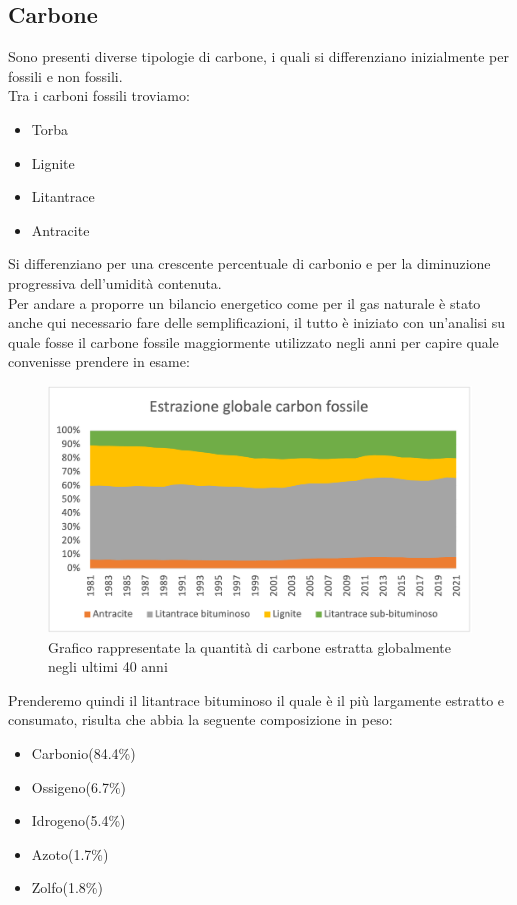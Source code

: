 \subsection{Carbone}
Sono presenti diverse tipologie di carbone, i quali si differenziano inizialmente per fossili e non fossili.\\
Tra i carboni fossili troviamo:
\begin{itemize}
    \item Torba
    \item Lignite
    \item Litantrace
    \item Antracite
\end{itemize}
Si differenziano per una crescente percentuale di carbonio e per la diminuzione progressiva dell'umidità contenuta.\\
Per andare a proporre un bilancio energetico come per il gas naturale è stato anche qui necessario fare delle semplificazioni, il tutto è iniziato con un'analisi su quale fosse il carbone fossile maggiormente utilizzato negli anni per capire quale convenisse prendere in esame:\cite{EIA-Statistics-World}\\
\begin{figure}[H]
    \centering
    \includegraphics[height=0.6\textwidth]{res/cap2/Grafico carbone}
    \caption{Grafico rappresentate la quantità di carbone estratta globalmente negli ultimi 40 anni}
\end{figure}\noindent
Prenderemo quindi il litantrace bituminoso il quale è il più largamente estratto e consumato, risulta che abbia la seguente composizione in peso:\cite{Composizione-antracite}\\
\begin{itemize}
    \item Carbonio(84.4\%)
    \item Ossigeno(6.7\%)
    \item Idrogeno(5.4\%)
    \item Azoto(1.7\%)
    \item Zolfo(1.8\%)
\end{itemize}
